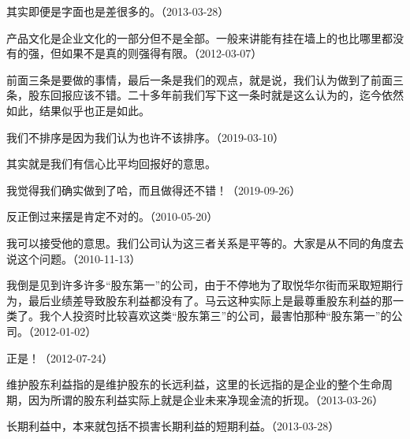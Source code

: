 其实即便是字面也是差很多的。（2013-03-28）

产品文化是企业文化的一部分但不是全部。一般来讲能有挂在墙上的也比哪里都没有的强，但如果不是真的则强得有限。（2012-03-07）


前面三条是要做的事情，最后一条是我们的观点，就是说，我们认为做到了前面三条，股东回报应该不错。二十多年前我们写下这一条时就是这么认为的，迄今依然如此，结果似乎也正是如此。

我们不排序是因为我们认为也许不该排序。（2019-03-10）


其实就是我们有信心比平均回报好的意思。

我觉得我们确实做到了哈，而且做得还不错！（2019-09-26）


反正倒过来摆是肯定不对的。（2010-05-20）

我可以接受他的意思。我们公司认为这三者关系是平等的。大家是从不同的角度去说这个问题。（2010-11-13）


我倒是见到许多许多“股东第一”的公司，由于不停地为了取悦华尔街而采取短期行为，最后业绩差导致股东利益都没有了。马云这种实际上是最尊重股东利益的那一类了。我个人投资时比较喜欢这类“股东第三”的公司，最害怕那种“股东第一”的公司。（2012-01-02）


正是！（2012-07-24）


维护股东利益指的是维护股东的长远利益，这里的长远指的是企业的整个生命周期，因为所谓的股东利益实际上就是企业未来净现金流的折现。（2013-03-26）


长期利益中，本来就包括不损害长期利益的短期利益。（2013-03-28）


